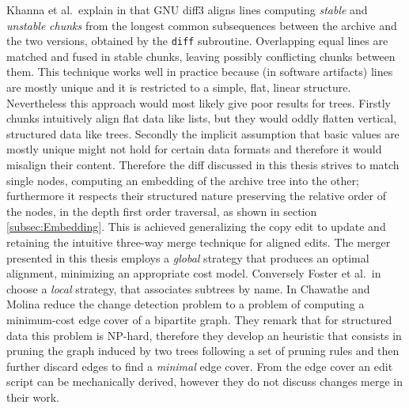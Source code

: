 \documentclass[../Thesis.tex]{subfiles}
\begin{document}
	Khanna et al.\ explain in \cite{PierceDiff3} that GNU diff3 aligns lines
	computing \emph{stable} and \emph{unstable} \emph{chunks} from the 
	longest common subsequences between the 	archive and the two versions, 
	obtained by the \texttt{diff} subroutine.
	Overlapping equal lines are matched and fused in stable chunks, leaving 
	possibly conflicting chunks between them.
	This technique works well in practice because (in software artifacts) lines
	are mostly unique and it is restricted to a simple, flat, linear structure.
	Nevertheless this approach would most likely give poor results for trees. 
	Firstly chunks intuitively align flat data like lists,
	but they would oddly flatten vertical, structured data like trees.
	Secondly the implicit assumption that basic values are mostly
	unique might not hold for certain data formats and therefore it would 
	misalign their content.
	Therefore the diff discussed in this thesis strives to match single nodes,
	computing an embedding of the archive tree into the other; furthermore
	it respects their structured nature preserving the relative order of the 
	nodes, in 	the depth first order traversal, as shown in section 
	\ref{subsec:Embedding}.
	This is achieved generalizing the copy edit to update and retaining the
	intuitive three-way merge technique for aligned edits.
	The merger presented in this thesis employs a \emph{global} strategy
	that produces an optimal alignment, minimizing an appropriate cost model.
	Conversely Foster et al.\ in \cite{Pierce07} choose a \emph{local} strategy,
	that associates subtrees by name.
	In \cite{Chawathe96} Chawathe and Molina reduce the change detection
	problem to a problem of computing a minimum-cost edge cover of 
	a bipartite graph. They remark that for structured data this problem
	is NP-hard, therefore they develop an heuristic that consists
	in pruning the graph induced by two trees following a set of pruning
	rules and then 	further discard edges to find a \emph{minimal} edge cover.
	From the edge cover an edit script can be mechanically derived, however
	they do not discuss changes merge in their work.
		
\end{document}
